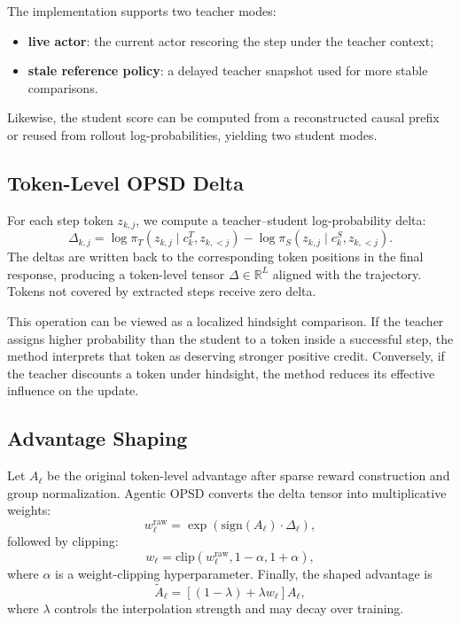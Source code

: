 \documentclass[11pt]{article}
\newcommand{\method}{Agentic OPSD}
\newcommand{\R}{\mathbb{R}}
\begin{document}
The implementation supports two teacher modes:
\begin{itemize}[leftmargin=1.5em]
    \item \textbf{live actor}: the current actor rescoring the step under the teacher context;
    \item \textbf{stale reference policy}: a delayed teacher snapshot used for more stable comparisons.
\end{itemize}
Likewise, the student score can be computed from a reconstructed causal prefix or reused from rollout log-probabilities, yielding two student modes.

\subsection{Token-Level OPSD Delta}
For each step token $z_{k,j}$, we compute a teacher--student log-probability delta:
\begin{equation}
\Delta_{k,j} =
\log \pi_T(z_{k,j} \mid c_k^T, z_{k,<j})
-
\log \pi_S(z_{k,j} \mid c_k^S, z_{k,<j}).
\end{equation}
The deltas are written back to the corresponding token positions in the final response, producing a token-level tensor $\Delta \in \R^L$ aligned with the trajectory. Tokens not covered by extracted steps receive zero delta.

This operation can be viewed as a localized hindsight comparison. If the teacher assigns higher probability than the student to a token inside a successful step, the method interprets that token as deserving stronger positive credit. Conversely, if the teacher discounts a token under hindsight, the method reduces its effective influence on the update.

\subsection{Advantage Shaping}
Let $A_{\ell}$ be the original token-level advantage after sparse reward construction and group normalization. \method{} converts the delta tensor into multiplicative weights:
\begin{equation}
w_{\ell}^{\text{raw}} = \exp(\mathrm{sign}(A_{\ell}) \cdot \Delta_{\ell}),
\end{equation}
followed by clipping:
\begin{equation}
w_{\ell} = \mathrm{clip}(w_{\ell}^{\text{raw}}, 1-\alpha, 1+\alpha),
\end{equation}
where $\alpha$ is a weight-clipping hyperparameter. Finally, the shaped advantage is
\begin{equation}
\tilde{A}_{\ell} = \left[(1-\lambda) + \lambda w_{\ell}\right] A_{\ell},
\end{equation}
where $\lambda$ controls the interpolation strength and may decay over training.
\end{document}
